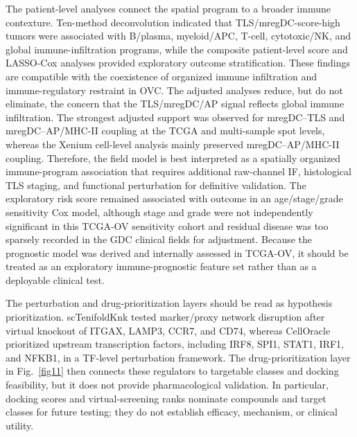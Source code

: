 \documentclass[pdflatex,sn-vancouver-num]{sn-jnl}
\begin{document}
The patient-level analyses connect the spatial program to a broader immune contexture. Ten-method deconvolution indicated that TLS/mregDC-score-high tumors were associated with B/plasma, myeloid/APC, T-cell, cytotoxic/NK, and global immune-infiltration programs, while the composite patient-level score and LASSO-Cox analyses provided exploratory outcome stratification. These findings are compatible with the coexistence of organized immune infiltration and immune-regulatory restraint in OVC\cite{bib90,bib91,bib94,bib95,bib103,bib105,bib106,bib107,bib108}. The adjusted analyses reduce, but do not eliminate, the concern that the TLS/mregDC/AP signal reflects global immune infiltration. The strongest adjusted support was observed for mregDC--TLS and mregDC--AP/MHC-II coupling at the TCGA and multi-sample spot levels, whereas the Xenium cell-level analysis mainly preserved mregDC--AP/MHC-II coupling. Therefore, the field model is best interpreted as a spatially organized immune-program association that requires additional raw-channel IF, histological TLS staging, and functional perturbation for definitive validation. The exploratory risk score remained associated with outcome in an age/stage/grade sensitivity Cox model, although stage and grade were not independently significant in this TCGA-OV sensitivity cohort and residual disease was too sparsely recorded in the GDC clinical fields for adjustment. Because the prognostic model was derived and internally assessed in TCGA-OV, it should be treated as an exploratory immune-prognostic feature set rather than as a deployable clinical test.

The perturbation and drug-prioritization layers should be read as hypothesis prioritization. scTenifoldKnk tested marker/proxy network disruption after virtual knockout of ITGAX, LAMP3, CCR7, and CD74, whereas CellOracle prioritized upstream transcription factors, including IRF8, SPI1, STAT1, IRF1, and NFKB1, in a TF-level perturbation framework. The drug-prioritization layer in Fig.~\ref{fig11} then connects these regulators to targetable classes and docking feasibility, but it does not provide pharmacological validation. In particular, docking scores and virtual-screening ranks nominate compounds and target classes for future testing; they do not establish efficacy, mechanism, or clinical utility.
\end{document}

